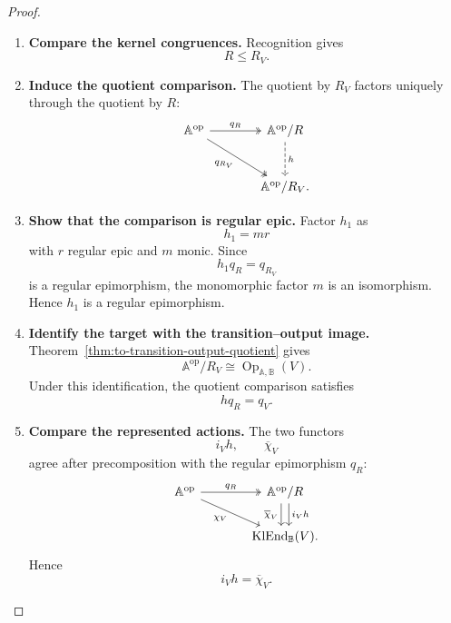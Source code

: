 \begin{proof}
    \leavevmode
    \begin{enumerate}
        \item \textbf{Compare the kernel congruences.}
        Recognition gives
        \[
            R\leq R_V.
        \]

        \item \textbf{Induce the quotient comparison.}
        The quotient by \(R_V\) factors uniquely through the quotient by \(R\):
        \[
        \begin{tikzcd}[column sep=large, row sep=large]
            \mathbb A^{\mathrm{op}}
                \arrow[r, two heads, "q_R"]
                \arrow[dr, two heads, "q_{R_V}"']
            &
            \mathbb A^{\mathrm{op}}/R
                \arrow[d, dashed, "h"]
            \\
            &
            \mathbb A^{\mathrm{op}}/R_V.
        \end{tikzcd}
        \]

        \item \textbf{Show that the comparison is regular epic.}
        Factor \(h_1\) as
        \[
            h_1=mr
        \]
        with \(r\) regular epic and \(m\) monic. Since
        \[
            h_1q_R=q_{R_V}
        \]
        is a regular epimorphism, the monomorphic factor \(m\) is an
        isomorphism. Hence \(h_1\) is a regular epimorphism.

        \item \textbf{Identify the target with the transition--output image.}
        Theorem~\ref{thm:to-transition-output-quotient} gives
        \[
            \mathbb A^{\mathrm{op}}/R_V
            \cong
            \operatorname{Op}_{\mathbb A,\mathbb B}(V).
        \]
        Under this identification, the quotient comparison satisfies
        \[
            hq_R=q_V.
        \]

        \item \textbf{Compare the represented actions.}
        The two functors
        \[
            i_Vh,
            \qquad
            \overline\chi_V
        \]
        agree after precomposition with the regular epimorphism \(q_R\):
        \[
        \begin{tikzcd}[column sep=large]
            \mathbb A^{\mathrm{op}}
                \arrow[r, two heads, "q_R"]
                \arrow[dr, "\chi_V"']
            &
            \mathbb A^{\mathrm{op}}/R
                \arrow[d, shift left=.7ex, "i_Vh"]
                \arrow[d, shift right=.7ex,
                "\overline\chi_V"']
            \\
            &
            \operatorname{KlEnd}_{\mathbb B}(V).
        \end{tikzcd}
        \]
        Hence
        \[
            i_Vh=\overline\chi_V.
        \]


\end{enumerate}
\end{proof}
